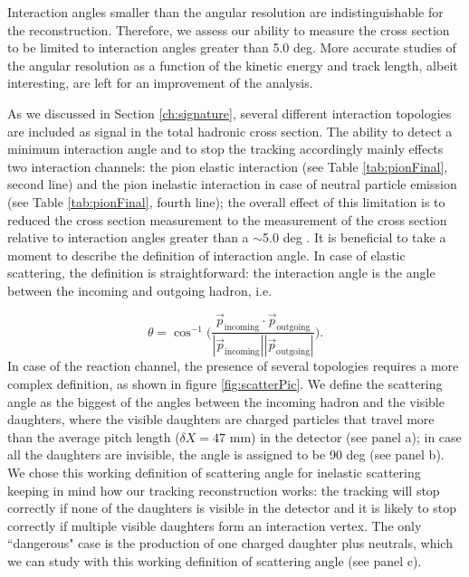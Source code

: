 Interaction angles smaller than the angular resolution are indistinguishable for the reconstruction. Therefore, we assess our ability to measure the cross section to be limited to interaction angles greater than 5.0 deg. More accurate studies of the angular resolution as a function of the kinetic energy and track length, albeit interesting, are left for an improvement of the analysis.  

As we discussed in Section \ref{ch:signature}, several different interaction topologies are included as signal in the total hadronic cross section. The ability to detect a minimum interaction angle  and to stop the tracking accordingly mainly effects two interaction channels: the pion elastic interaction (see Table \ref{tab:pionFinal}, second line) and the pion inelastic interaction in case of neutral particle emission (see Table \ref{tab:pionFinal}, fourth line); the overall effect of this limitation is to reduced the cross section measurement to the measurement of the cross section relative to interaction angles greater than a $\sim$5.0 deg .
It is beneficial to take a moment to describe the definition of interaction angle.  In case of elastic scattering, the definition is straightforward: the interaction angle is the angle between the incoming and outgoing hadron, i.e.

\begin{equation}  
\theta = \cos^{-1} \Big(\frac{\vec p _{\text{incoming}}  \cdot\vec p _{\text{outgoing}}}{|\vec p _{\text{incoming}}|  |\vec p _{\text{outgoing}}| }\Big).
\end{equation}   
In case of the reaction channel,  the presence of several topologies requires a more complex definition, as shown in figure \ref{fig:scatterPic}.  We define the scattering angle as the biggest of the angles between the incoming hadron and the visible daughters, where the visible daughters are charged particles that travel more than the average pitch length ($\delta X = 47$ mm) in the detector (see panel a); in case all the daughters are invisible, the angle is assigned to be 90 deg (see panel b). We chose this working definition of scattering angle for inelastic scattering keeping in mind how our tracking reconstruction works: the tracking will stop correctly if none of the daughters is visible in the detector and it is likely to stop correctly if multiple visible daughters form an interaction vertex. The only ``dangerous" case is the production of one charged daughter plus neutrals, which we can study with this working definition of scattering angle (see panel c).


